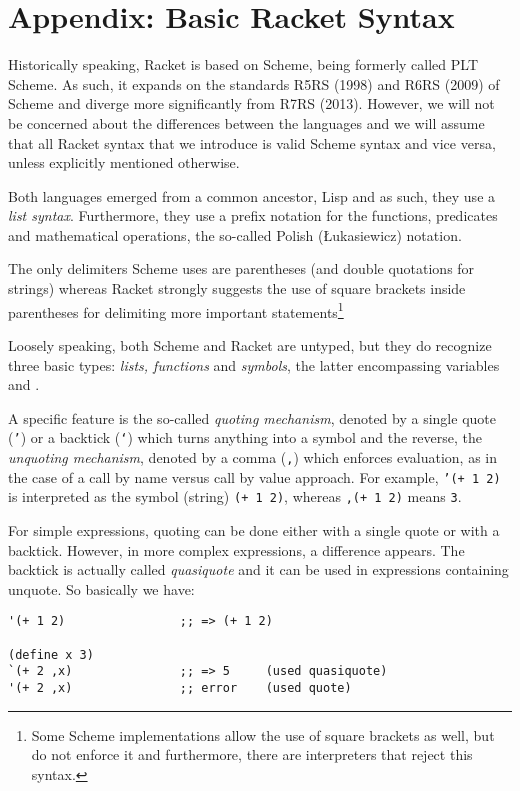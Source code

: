 
\chapter*{Appendix: Basic Racket Syntax}
\label{ch:a-racket}

Historically speaking, Racket is based on Scheme, being formerly called
PLT Scheme. As such, it expands on the standards R5RS (1998) and R6RS (2009)
of Scheme and diverge more significantly from R7RS (2013). However, we will
not be concerned about the differences between the languages and we will
assume that all Racket syntax that we introduce is valid Scheme syntax and
vice versa, unless explicitly mentioned otherwise.

Both languages emerged from a common ancestor, Lisp and as such, they
use a \emph{list syntax}. Furthermore, they use a prefix notation
for the functions, predicates and mathematical operations, the so-called
Polish ({\L}ukasiewicz) notation.

The only delimiters Scheme uses are parentheses (and double quotations
for strings) whereas Racket strongly suggests the use of square brackets
inside parentheses for delimiting more important statements\footnote{Some %
  Scheme implementations allow the use of square brackets as well, but
  do not enforce it and furthermore, there are interpreters that reject
  this syntax.}

Loosely speaking, both Scheme and Racket are untyped, but they do recognize
three basic types: \emph{lists, functions} and \emph{symbols}, the
latter encompassing variables and .

A specific feature is the so-called \emph{quoting mechanism}, denoted
by a single quote (\texttt{'}) or a backtick (\texttt{`}) which
turns anything into a symbol and the reverse, the \emph{unquoting mechanism},
denoted by a comma (\texttt{,}) which enforces evaluation, as in the
case of a call by name versus call by value approach. For example,
\texttt{'(+ 1 2)} is interpreted as the symbol (string) \texttt{(+ 1 2)},
whereas \texttt{,(+ 1 2)} means \texttt{3}.

For simple expressions, quoting can be done either with a single
quote or with a backtick. However, in more complex expressions,
a difference appears. The backtick is actually called
\emph{quasiquote} and it can be used in expressions containing
unquote. So basically we have:
{
  \small
\begin{verbatim}
'(+ 1 2)                ;; => (+ 1 2)

(define x 3)
`(+ 2 ,x)               ;; => 5     (used quasiquote)
'(+ 2 ,x)               ;; error    (used quote)
\end{verbatim}
}

